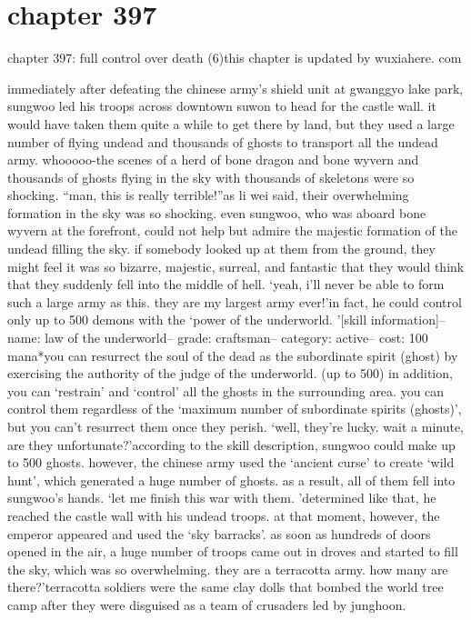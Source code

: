 \section{chapter 397}

chapter 397: full control over death (6)this chapter is updated by wuxiahere.
com




immediately after defeating the chinese army’s shield unit at gwanggyo lake park, sungwoo led his troops across downtown suwon to head for the castle wall.
it would have taken them quite a while to get there by land, but they used a large number of flying undead and thousands of ghosts to transport all the undead army.
whooooo-the scenes of a herd of bone dragon and bone wyvern and thousands of ghosts flying in the sky with thousands of skeletons were so shocking.
“man, this is really terrible!”as li wei said, their overwhelming formation in the sky was so shocking.
 even sungwoo, who was aboard bone wyvern at the forefront, could not help but admire the majestic formation of the undead filling the sky.
if somebody looked up at them from the ground, they might feel it was so bizarre, majestic, surreal, and fantastic that they would think that they suddenly fell into the middle of hell.
‘yeah, i’ll never be able to form such a large army as this.
 they are my largest army ever!’in fact, he could control only up to 500 demons with the ‘power of the underworld.
’[skill information]– name: law of the underworld– grade: craftsman– category: active– cost: 100 mana*you can resurrect the soul of the dead as the subordinate spirit (ghost) by exercising the authority of the judge of the underworld.
 (up to 500)
in addition, you can ‘restrain’ and ‘control’ all the ghosts in the surrounding area.
 you can control them regardless of the ‘maximum number of subordinate spirits (ghosts)’, but you can’t resurrect them once they perish.
‘well, they’re lucky.
 wait a minute, are they unfortunate?’according to the skill description, sungwoo could make up to 500 ghosts.
however, the chinese army used the ‘ancient curse’ to create ‘wild hunt’, which generated a huge number of ghosts.
 as a result, all of them fell into sungwoo’s hands.
‘let me finish this war with them.
’determined like that, he reached the castle wall with his undead troops.
at that moment, however, the emperor appeared and used the ‘sky barracks’.
as soon as hundreds of doors opened in the air, a huge number of troops came out in droves and started to fill the sky, which was so overwhelming.
they are a terracotta army.
 how many are there?’terracotta soldiers were the same clay dolls that bombed the world tree camp after they were disguised as a team of crusaders led by junghoon.
